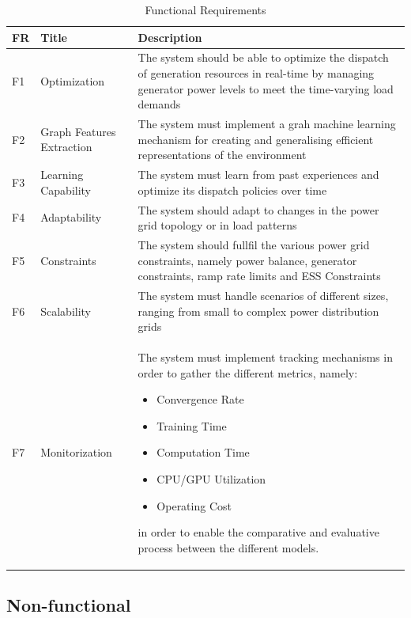 \begin{table}[h!]
	\centering
	\caption{Functional Requirements}
	\begin{tabular}{|P{1cm}|P{3cm}|p{10cm}|  }
		\hline
		\textbf{FR} & \textbf{Title} & \textbf{Description} \\
		\hline
		F1 & Optimization & The system should be able to optimize the dispatch of generation resources in real-time by managing generator power levels to meet the time-varying load demands \\
		\hline
		F2 & Graph Features Extraction & The system must implement a grah machine learning mechanism for creating and generalising efficient representations of the environment \\
		\hline
		F3 & Learning Capability & The system must learn from past experiences and optimize its dispatch policies over time \\
		\hline
		F4 & Adaptability & The system should adapt to changes in the power grid topology or in load patterns \\
		\hline
		F5 & Constraints & The system should fullfil the various power grid constraints, namely power balance, generator constraints, ramp rate limits and \ac{ESS} Constraints \\
		\hline
		F6 & Scalability & The system must handle scenarios of different sizes, ranging from small to complex power distribution grids \\
		\hline
		F7 & Monitorization & The system must implement tracking mechanisms in order to gather the different metrics, namely: 
		\begin{itemize}
			\item Convergence Rate
			\item Training Time
			\item Computation Time
			\item CPU/GPU Utilization
			\item Operating Cost
		\end{itemize} 
		in order to enable the comparative and evaluative process between the different models. \\
		\hline
	\end{tabular}
\end{table}

\subsection{Non-functional}

